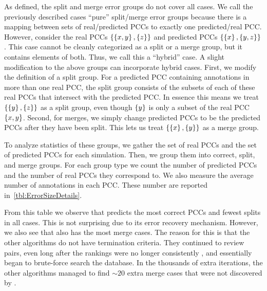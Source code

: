     As defined, the split and merge error groups do not cover all cases.
    We call the previously described cases ``pure'' split/merge error groups because there is a mapping between
      sets of real/predicted PCCs to exactly one predicted/real PCC.
    However, consider the real PCCs $\left\{\left\{x, y\right\}, \left\{z\right\}\right\}$ and predicted PCCs $\left\{\left\{x\right\},
      \left\{y, z\right\}\right\}$.
    This case cannot be cleanly categorized as a split or a merge group, but it contains elements of both.
    Thus, we call this a ``hybrid'' case.
    A slight modification to the above groups can incorporate hybrid cases.
    First, we modify the definition of a split group.
    For a predicted PCC containing annotations in more than one real PCC, the split group consists of the subsets
      of each of these real PCCs that intersect with the predicted PCC.
    In essence this means we treat $\left\{\left\{y\right\}, \left\{z\right\}\right\}$ as a split group, even though $\left\{y\right\}$ is
      only a subset of the real PCC $\left\{x, y\right\}$.
    Second, for merges, we simply change predicted PCCs to be the predicted PCCs after they have been split.
    This lets us treat $\left\{\left\{x\right\}, \left\{y\right\}\right\}$ as a merge group.


    To analyze statistics of these groups, we gather the set of real PCCs and the set of predicted PCCs for each
      simulation.
    Then, we group them into correct, split, and merge groups.
    For each group type we count the number of predicted PCCs and the number of real PCCs they correspond to.
    We also measure the average number of annotations in each PCC.
    These number are reported in~\cref{tbl:ErrorSizeDetails}.

    From this table we observe that  predicts the most correct PCCs and fewest splits in all cases.
    This is not surprising due to its error recovery mechanism.
    However, we also see that  also has the most merge cases.
    The reason for this is that the other algorithms do not have termination criteria.
    They continued to review pairs, even long after the rankings were no longer consistently \meaningful{}, and
      essentially began to brute-force search the database.
    In the thousands of extra iterations, the other algorithms managed to find ${\sim}20$ extra merge cases that
      were not discovered by .

